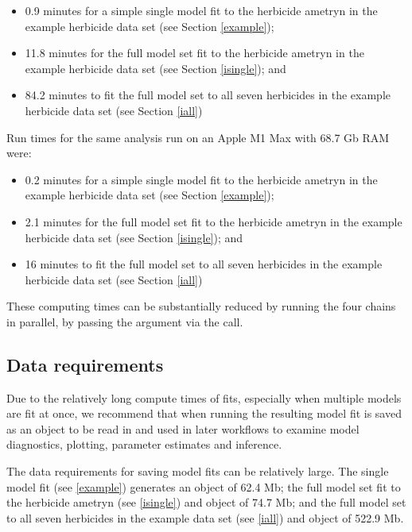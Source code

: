 \documentclass[
  shortnames]{jss}
\begin{document}
\begin{itemize}
\item
  0.9 minutes for a simple single model fit to the herbicide ametryn in the example herbicide data set (see Section \ref{example});
\item
  11.8 minutes for the full  model set fit to the herbicide ametryn in the example herbicide data set (see Section \ref{isingle}); and
\item
  84.2 minutes to fit the full  model set to all seven herbicides in the example herbicide data set (see Section \ref{iall})
\end{itemize}

Run times for the same analysis run on an Apple M1 Max with 68.7 Gb RAM were:

\begin{itemize}
\item
  0.2 minutes for a simple single model fit to the herbicide ametryn in the example herbicide data set (see Section \ref{example});
\item
  2.1 minutes for the full  model set fit to the herbicide ametryn in the example herbicide data set (see Section \ref{isingle}); and
\item
  16 minutes to fit the full  model set to all seven herbicides in the example herbicide data set (see Section \ref{iall})
\end{itemize}

These computing times can be substantially reduced by running the four chains in parallel, by passing the argument  via the  call.

\hypertarget{data-requirements}{%
\subsection{Data requirements}\label{data-requirements}}

Due to the relatively long compute times of  fits, especially when multiple models are fit at once, we recommend that when running  the resulting model fit is saved as an  object to be read in and used in later workflows to examine model diagnostics, plotting, parameter estimates and inference.

The data requirements for saving model fits can be relatively large. The single model fit (see \ref{example}) generates an object of 62.4 Mb; the full  model set fit to the herbicide ametryn (see \ref{isingle}) and object of 74.7 Mb; and the full  model set to all seven herbicides in the example data set (see \ref{iall}) and object of 522.9 Mb.
\end{document}
